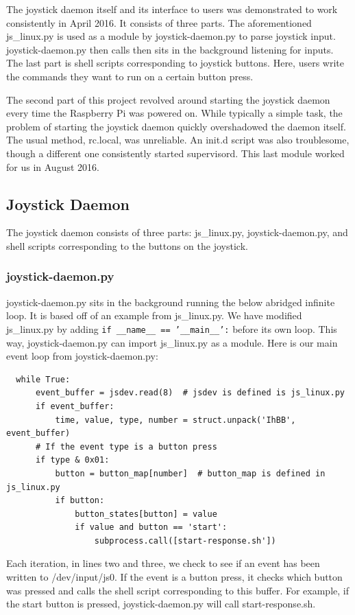\documentclass[titlepage]{article}
\begin{document}
The joystick daemon itself and its interface to users was demonstrated to work consistently in April 2016.
It consists of three parts. The aforementioned js\_linux.py is used as a module by joystick-daemon.py to parse joystick input. joystick-daemon.py then calls then sits in the background listening for inputs. The last part is shell scripts corresponding to joystick buttons. Here, users write the commands they want to run on a certain button press. 

The second part of this project revolved around starting the joystick daemon every time the Raspberry Pi was powered on. While typically a simple task, the problem of starting the joystick daemon quickly overshadowed the daemon itself. The usual method, rc.local, was unreliable. An init.d script was also troublesome, though a different one consistently started supervisord. This last module worked for us in August 2016.

\subsection{Joystick Daemon}
The joystick daemon consists of three parts: js\_linux.py, joystick-daemon.py, and shell scripts corresponding to the buttons on the joystick.  
\subsubsection{joystick-daemon.py}
joystick-daemon.py sits in the background running the below abridged infinite loop. It is based off of an example from js\_linux.py. We have modified js\_linux.py by adding \texttt{if \_\_name\_\_ == '\_\_main\_\_':} before its own loop. This way, joystick-daemon.py can import js\_linux.py as a module. Here is our main event loop from joystick-daemon.py:
\begin{lstlisting}
  while True:
      event_buffer = jsdev.read(8)  # jsdev is defined is js_linux.py
      if event_buffer:
          time, value, type, number = struct.unpack('IhBB', event_buffer)
      # If the event type is a button press 
      if type & 0x01:
          button = button_map[number]  # button_map is defined in js_linux.py
          if button:
              button_states[button] = value
              if value and button == 'start':
                  subprocess.call([start-response.sh'])
\end{lstlisting}
Each iteration, in lines two and three, we check to see if an event has been written to /dev/input/js0. If the event is a button press, it checks which button was pressed and calls the shell script corresponding to this buffer. For example, if the start button is pressed, joystick-daemon.py will call start-response.sh.
\end{document}
